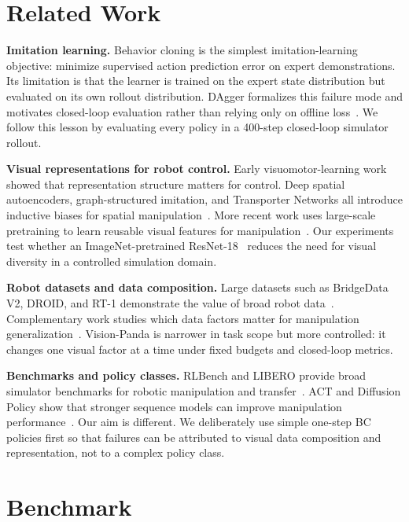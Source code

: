 \documentclass[10pt,twocolumn,letterpaper]{article}
\newcommand{\method}{Vision-Panda}
\begin{document}
\section{Related Work}
\textbf{Imitation learning.}
Behavior cloning is the simplest imitation-learning objective: minimize supervised action prediction error on expert demonstrations. Its limitation is that the learner is trained on the expert state distribution but evaluated on its own rollout distribution. DAgger formalizes this failure mode and motivates closed-loop evaluation rather than relying only on offline loss~\cite{ross2011dagger}. We follow this lesson by evaluating every policy in a 400-step closed-loop simulator rollout.

\textbf{Visual representations for robot control.}
Early visuomotor-learning work showed that representation structure matters for control. Deep spatial autoencoders, graph-structured imitation, and Transporter Networks all introduce inductive biases for spatial manipulation~\cite{finn2016dsae,sieb2020graph,zeng2021transporter}. More recent work uses large-scale pretraining to learn reusable visual features for manipulation~\cite{nair2023r3m,seo2023mwm}. Our experiments test whether an ImageNet-pretrained ResNet-18~\cite{deng2009imagenet,he2016resnet} reduces the need for visual diversity in a controlled simulation domain.

\textbf{Robot datasets and data composition.}
Large datasets such as BridgeData V2, DROID, and RT-1 demonstrate the value of broad robot data~\cite{walke2023bridge,khazatsky2024droid,brohan2023rt1}. Complementary work studies which data factors matter for manipulation generalization~\cite{saxena2025whatmatters,gao2024compositional,xie2023generalizationgap,garcia2023robust}. \method{} is narrower in task scope but more controlled: it changes one visual factor at a time under fixed budgets and closed-loop metrics.

\textbf{Benchmarks and policy classes.}
RLBench and LIBERO provide broad simulator benchmarks for robotic manipulation and transfer~\cite{james2020rlbench,liu2023libero}. ACT and Diffusion Policy show that stronger sequence models can improve manipulation performance~\cite{zhao2023act,chi2023diffusion}. Our aim is different. We deliberately use simple one-step BC policies first so that failures can be attributed to visual data composition and representation, not to a complex policy class.

\section{Benchmark}
\end{document}
